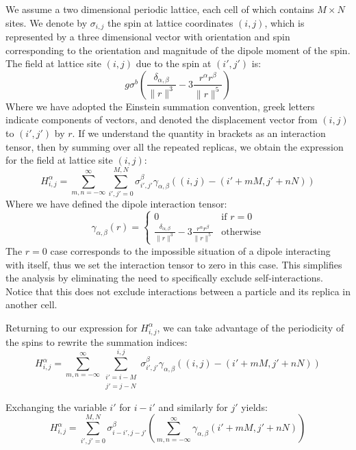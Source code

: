 \documentclass{article}
\theoremstyle{definition}
\begin{document}
We assume a two dimensional periodic lattice, each cell of which contains $M
\times N$ sites. We denote by $\sigma_{i,j}$ the spin at lattice coordinates
$(i,j)$, which is represented by a three dimensional vector with orientation and
spin corresponding to the orientation and magnitude of the dipole moment of the
spin. The field at lattice site $(i,j)$ due to the spin at $(i',j')$ is:
\begin{equation}
g \sigma^b \left( \frac{\delta_{\alpha,\beta}}{\| r \|^3} - 3 \frac{r^\alpha
r^\beta}{\| r \|^5} \right)
\end{equation}
Where we have adopted the Einstein summation convention, greek letters indicate
components of vectors, and denoted the displacement vector from $(i,j)$ to
$(i',j')$ by $r$. If we understand the quantity in brackets as an interaction
tensor, then by summing over all the repeated replicas, we obtain the expression
for the field at lattice site $(i,j)$:
\begin{equation}
H_{i,j}^\alpha = \sum_{m,n=-\infty}^{\infty} \sum_{i',j'=0}^{M,N}
\sigma_{i',j'}^\beta \gamma_{\alpha,\beta} \left( (i,j) - (i' + mM, j' + nN)
\right)
\end{equation}
Where we have defined the dipole interaction tensor:
\begin{displaymath}
\gamma_{\alpha,\beta}(r) = \begin{cases}
  0 & \text{if } r = 0 \\
  \frac{\delta_{\alpha,\beta}}{\| r \|^3} - 3 \frac{r^\alpha r^\beta}{\| r \|^5}
& \text{otherwise}
\end{cases}
\end{displaymath}
The $r = 0$ case corresponds to the impossible situation of a dipole interacting with
itself, thus we set the interaction tensor to zero in this case. This simplifies
the analysis by eliminating the need to specifically exclude self-interactions.
Notice that this does not exclude interactions between a particle and its
replica in another cell.

Returning to our expression for $H_{i,j}^\alpha$, we can take advantage of the
periodicity of the spins to rewrite the summation indices:
\begin{displaymath}
H_{i,j}^\alpha = \sum_{m,n=-\infty}^{\infty} \sum_{\substack{i' = i - M\\j' = j
- N}}^{i,j} \sigma_{i',j'}^\beta \gamma_{\alpha,\beta} \left( (i,j) - (i' + mM,
j' + nN) \right)
\end{displaymath}

Exchanging the variable $i'$ for $i - i'$ and similarly for $j'$ yields:
\begin{displaymath}
H_{i,j}^\alpha = \sum_{i',j' = 0}^{M,N}
\sigma_{i-i',j-j'}^\beta \left( \sum_{m,n=-\infty}^{\infty}
\gamma_{\alpha,\beta} \left(i' + mM, j' + nN \right) \right)
\end{displaymath}
\end{document}
